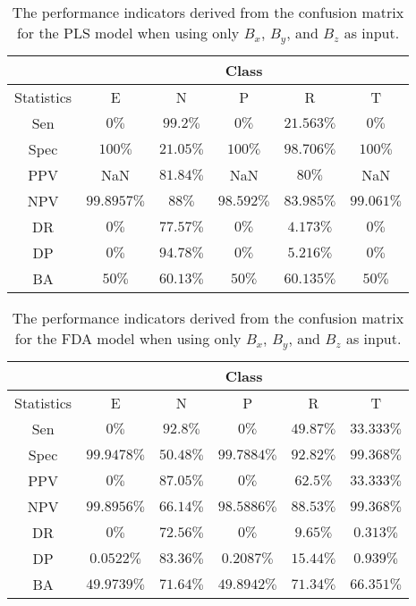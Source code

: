 \begin{table}[!ht]
	\centering
	\begin{tabular}{|c|c|c|c|c|c|}
		\hline
		 & \multicolumn{5}{c|}{Class} \\ \hline
		Statistics & E & N & P & R & T \\ \hline
		Sen & $0\%$ & $99.2\%$ & $0\%$ & $21.563\%$ & $0\%$ \\ \hline
		Spec & $100\%$ & $21.05\%$ & $100\%$ & $98.706\%$ & $100\%$ \\ \hline
		PPV & NaN & $81.84\%$ & NaN & $80\%$ & NaN \\ \hline
		NPV & $99.8957\%$ & $88\%$ & $98.592\%$ & $83.985\%$ & $99.061\%$ \\ \hline
		DR & $0\%$ & $77.57\%$ & $0\%$ & $4.173\%$ & $0\%$ \\ \hline
		DP & $0\%$ & $94.78\%$ & $0\%$ & $5.216\%$ & $0\%$ \\ \hline
		BA & $50\%$ & $60.13\%$ & $50\%$ & $60.135\%$ & $50\%$ \\ \hline
	\end{tabular}
	\caption{The performance indicators derived from the confusion matrix for the PLS model when using only $B_{x}$, $B_{y}$, and $B_{z}$ as input.}
	\label{tab:cs:reverse:coord:pls}
\end{table}

\begin{table}[!ht]
	\centering
	\begin{tabular}{|c|c|c|c|c|c|}
		\hline
		 & \multicolumn{5}{c|}{Class} \\ \hline
		Statistics & E & N & P & R & T \\ \hline
		Sen & $0\%$ & $92.8\%$ & $0\%$ & $49.87\%$ & $33.333\%$ \\ \hline
		Spec & $99.9478\%$ & $50.48\%$ & $99.7884\%$ & $92.82\%$ & $99.368\%$ \\ \hline
		PPV & $0\%$ & $87.05\%$ & $0\%$ & $62.5\%$ & $33.333\%$ \\ \hline
		NPV & $99.8956\%$ & $66.14\%$ & $98.5886\%$ & $88.53\%$ & $99.368\%$ \\ \hline
		DR & $0\%$ & $72.56\%$ & $0\%$ & $9.65\%$ & $0.313\%$ \\ \hline
		DP & $0.0522\%$ & $83.36\%$ & $0.2087\%$ & $15.44\%$ & $0.939\%$ \\ \hline
		BA & $49.9739\%$ & $71.64\%$ & $49.8942\%$ & $71.34\%$ & $66.351\%$ \\ \hline
	\end{tabular}
	\caption{The performance indicators derived from the confusion matrix for the FDA model when using only $B_{x}$, $B_{y}$, and $B_{z}$ as input.}
	\label{tab:cs:reverse:coord:fda}
\end{table}

